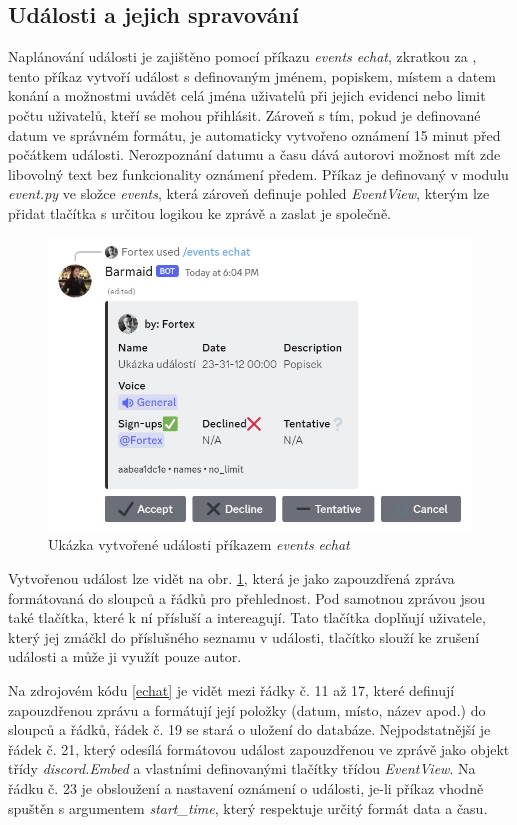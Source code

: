 \documentclass[
  program=inf,
biblatex=false,
sourcecodes=true,
joinlists=true,
  figures=true,
  tables=true,
  glossaries=true,
  index=false
]{kidiplom}
\begin{document}
\subsection{Události a jejich spravování}
Naplánování události je zajištěno pomocí příkazu {\it events echat}, zkratkou za , 
tento příkaz vytvoří událost s definovaným jménem, popiskem, místem a datem konání a možnostmi uvádět celá jména
uživatelů při jejich evidenci nebo limit počtu uživatelů, kteří se mohou přihlásit. 
Zároveň s tím, pokud je definované
datum ve správném formátu, je automaticky vytvořeno oznámení 15 minut před počátkem události. Nerozpoznání datumu a času 
dává autorovi možnost mít zde libovolný text bez funkcionality oznámení předem. Příkaz je definovaný v modulu {\it event.py} ve složce {\it events}, která
zároveň definuje pohled {\it EventView}, kterým lze přidat tlačítka s určitou logikou ke zprávě a zaslat je společně.

\begin{figure}[h!]
  \centering \includegraphics[scale=0.99]{eventukazka}
  \caption{\label{eventukazka}Ukázka vytvořené události příkazem {\it events echat}}
\end{figure}

Vytvořenou událost lze vidět na obr. \ref{eventukazka}, která je jako zapouzdřená zpráva
formátovaná do sloupců a řádků pro přehlednost. Pod samotnou zprávou jsou také tlačítka, které
k ní přísluší a intereagují. Tato tlačítka doplňují uživatele, který jej zmáčkl do příslušného
seznamu v události, tlačítko  slouží ke zrušení události a může ji využít pouze autor.
\newpage

Na zdrojovém kódu \ref{echat} je vidět mezi řádky č. 11 až 17, které definují
zapouzdřenou zprávu a formátují její položky (datum, místo, název apod.) do sloupců a řádků,
řádek č. 19 se stará o uložení do databáze. Nejpodstatnější je řádek č. 21, který odesílá
formátovou událost zapouzdřenou ve zprávě jako objekt třídy {\it discord.Embed} a
vlastními definovanými tlačítky třídou {\it EventView}. Na řádku č. 23 je
obsloužení a nastavení oznámení o události, je-li příkaz vhodně spuštěn s argumentem {\it start\_time}, který
respektuje určitý formát data a času.
\end{document}
